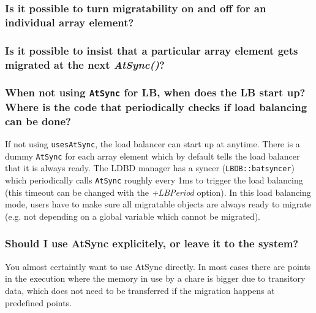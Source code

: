 \subsubsection{Is it possible to turn migratability on and off for an individual array
element?}



\subsubsection{Is it possible to insist that a particular array element gets migrated
at the next {\em AtSync()}?}



\subsubsection{When not using {\tt AtSync} for LB, when does the LB start
up? Where is the code that periodically checks if load balancing can be
done?}

If not using {\tt usesAtSync}, the load balancer can start up at
anytime. There is a dummy {\tt AtSync} for each array element which
by default tells the load balancer that it is always ready. The LDBD manager
has a syncer ({\tt LBDB::batsyncer}) which periodically calls {\tt AtSync}
roughly every 1ms to trigger the load balancing (this timeout can be changed
with the {\em +LBPeriod} option). In this load balancing
mode, users have to make sure all migratable objects are always ready to
migrate (e.g. not depending on a global variable which cannot be migrated).

\subsubsection{Should I use AtSync explicitely, or leave it to the system?}

You almost certaintly want to use AtSync directly. In most cases there are
points in the execution where the memory in use by a chare is bigger due to
transitory data, which does not need to be transferred if the migration happens
at predefined points.


